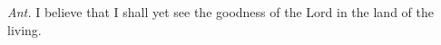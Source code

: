 \begin{Parallel}[v]{\colw}{\colx}
{}
{\vern
{\noindent
\textit{Ant.} I believe that I shall yet see the goodness of the Lord in the land of the living.}}

\end{Parallel}